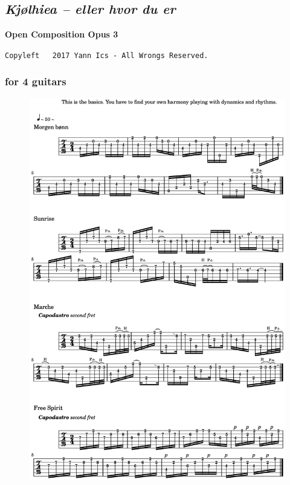 \chapter*{}

\thispagestyle{empty}

\section*{\textsl{Kj{\o}lhiea -- eller hvor du er}}
\label{kjcccc}

\begin{center} 
\textbf{Open Composition Opus 3}

{\scriptsize  \texttt{Copyleft \textcopyleft \, 2017 Yann Ics - All Wrongs Reserved.}}
 \end{center} 
 
\subsection*{\quad for 4 guitars}
\label{kjccqg}
\label{kj}

\vspace{-5mm}

\begin{figure}[H]
\begin{center}
\includegraphics[scale=0.23]{img/5573.jpg}
\end{center}
\end{figure}

